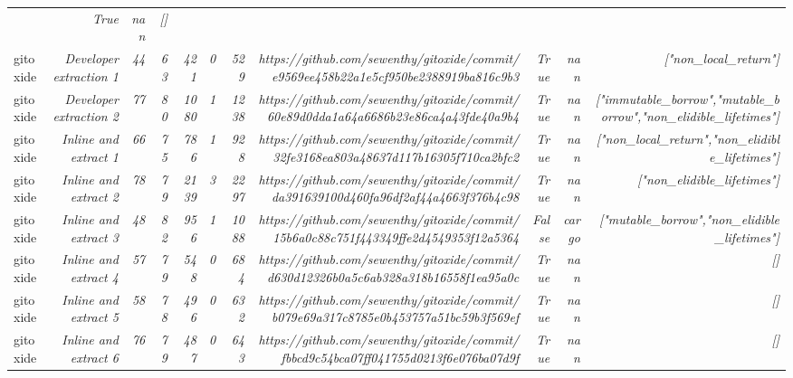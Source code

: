 \begin{table}[]
{\begin{tabular}{lrrrrrrrrrr}
{} & \textit{True} & \textit{nan} & \textit{[]} \\
gitoxide & \textit{Developer extraction 1} & \textit{44} & \textit{63} & \textit{421} & \textit{0} & \textit{529} & \textit{https://github.com/sewenthy/gitoxide/commit/e9569ee458b22a1e5cf950be2388919ba816c9b3
} & \textit{True} & \textit{nan} & \textit{["non_local_return"]} \\
gitoxide & \textit{Developer extraction 2} & \textit{77} & \textit{80} & \textit{1080} & \textit{1} & \textit{1238} & \textit{https://github.com/sewenthy/gitoxide/commit/60e89d0dda1a64a6686b23e86ca4a43fde40a9b4
} & \textit{True} & \textit{nan} & \textit{["immutable_borrow","mutable_borrow","non_elidible_lifetimes"]} \\
gitoxide & \textit{Inline and extract 1} & \textit{66} & \textit{75} & \textit{786} & \textit{1} & \textit{928} & \textit{https://github.com/sewenthy/gitoxide/commit/32fe3168ea803a48637d117b16305f710ca2bfc2
} & \textit{True} & \textit{nan} & \textit{["non_local_return","non_elidible_lifetimes"]} \\
gitoxide & \textit{Inline and extract 2} & \textit{78} & \textit{79} & \textit{2139} & \textit{3} & \textit{2297} & \textit{https://github.com/sewenthy/gitoxide/commit/da391639100d460fa96df2af44a4663f376b4c98
} & \textit{True} & \textit{nan} & \textit{["non_elidible_lifetimes"]} \\
gitoxide & \textit{Inline and extract 3} & \textit{48} & \textit{82} & \textit{956} & \textit{1} & \textit{1088} & \textit{https://github.com/sewenthy/gitoxide/commit/15b6a0c88c751f443349ffe2d4549353f12a5364
} & \textit{False} & \textit{cargo} & \textit{["mutable_borrow","non_elidible_lifetimes"]} \\
gitoxide & \textit{Inline and extract 4} & \textit{57} & \textit{79} & \textit{548} & \textit{0} & \textit{684} & \textit{https://github.com/sewenthy/gitoxide/commit/d630d12326b0a5c6ab328a318b16558f1ea95a0c
} & \textit{True} & \textit{nan} & \textit{[]} \\
gitoxide & \textit{Inline and extract 5} & \textit{58} & \textit{78} & \textit{496} & \textit{0} & \textit{632} & \textit{https://github.com/sewenthy/gitoxide/commit/b079e69a317c8785e0b453757a51bc59b3f569ef
} & \textit{True} & \textit{nan} & \textit{[]} \\
gitoxide & \textit{Inline and extract 6} & \textit{76} & \textit{79} & \textit{487} & \textit{0} & \textit{643} & \textit{https://github.com/sewenthy/gitoxide/commit/fbbcd9c54bca07ff041755d0213f6e076ba07d9f
} & \textit{True} & \textit{nan} & \textit{[]} \\

\end{tabular}}
\end{table}
